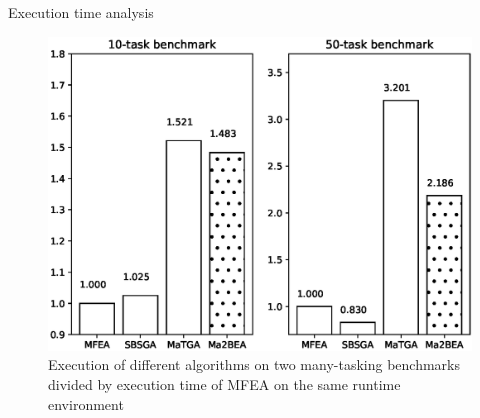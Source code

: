 \begin{frame}{Execution time analysis}
\begin{figure}[H]
    \centering
    \includegraphics[width=0.7\linewidth]{figure/experiment/runtime.eps}
    \caption{Execution of different algorithms on two many-tasking benchmarks divided by execution time of MFEA on the same runtime environment}
    \label{fig:runtime}
\end{figure}
\end{frame}